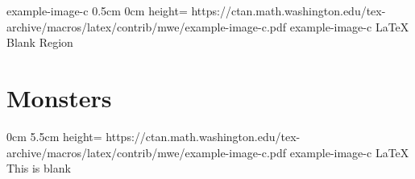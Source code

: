 \documentclass[letterpaper,openany,twoside,twocolumn]{book}
\begin{document}
		{example-image-c}%
		{0.5cm}%
		{0cm}%
		{height=\paperheight}%
		{https://ctan.math.washington.edu/tex-archive/macros/latex/contrib/mwe/example-image-c.pdf}%
		{example-image-c}%
		{LaTeX}%
		{Blank Region}%
	
	\tableofcontents
	
	\mainmatter
	
	\MonsterSheetGeometry
	\part{Monsters}
	
	
		{0cm}%
		{5.5cm}%
		{height=\paperheight}%
		{https://ctan.math.washington.edu/tex-archive/macros/latex/contrib/mwe/example-image-c.pdf}%
		{example-image-c}%
		{LaTeX}%
		{This is blank}%
\end{document}
